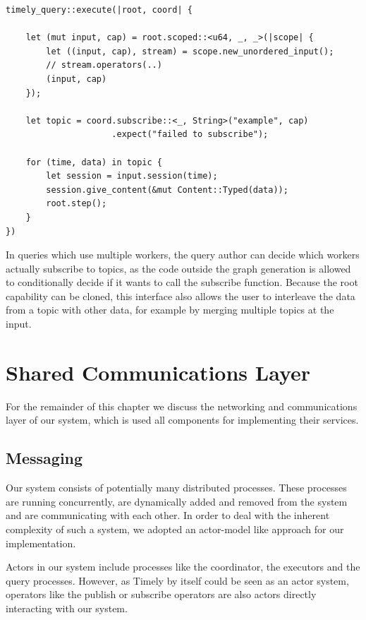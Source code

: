 \begin{lstlisting}[caption={[Typical use of the subscription handle]
Typical use of the subscription handle. This query subscribes to a single topic of
strings, with \lstinline{u64} being the type of the timestamps.
}]
timely_query::execute(|root, coord| {

    let (mut input, cap) = root.scoped::<u64, _, _>(|scope| {
        let ((input, cap), stream) = scope.new_unordered_input();
        // stream.operators(..)
        (input, cap)
    });

    let topic = coord.subscribe::<_, String>("example", cap)
                     .expect("failed to subscribe");

    for (time, data) in topic {
        let session = input.session(time);
        session.give_content(&mut Content::Typed(data));
        root.step();
    }
})
\end{lstlisting}

In queries which use multiple workers, the query author can decide which workers
actually subscribe to topics, as the code outside the graph generation is allowed
to conditionally decide if it wants to call the subscribe function. Because
the root capability can be cloned, this interface also allows the user to
interleave the data from a topic with other data, for example by merging
multiple topics at the input.

\section{Shared Communications Layer}

For the remainder of this chapter we discuss the networking and communications
layer of our system, which is used all components for implementing their
services.

\subsection{Messaging}

Our system consists of potentially many distributed processes. These processes
are running concurrently, are dynamically added and removed from the system
and are communicating with each other. In order to deal with the inherent
complexity of such a system, we adopted an actor-model like approach for our
implementation.

Actors in our system include processes like the coordinator, the executors 
and the query processes. However, as Timely by itself could be seen as an
actor system, operators like the publish or subscribe operators are also actors
directly interacting with our system.

